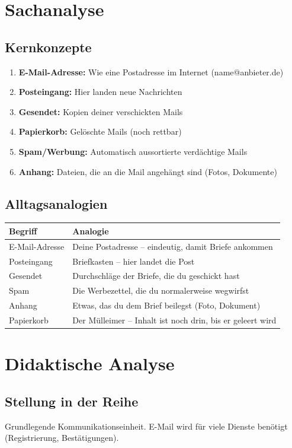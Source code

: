 \documentclass[11pt,a4paper]{article}
\begin{document}
\section{Sachanalyse}

\subsection{Kernkonzepte}
\begin{enumerate}
    \item \textbf{E-Mail-Adresse:} Wie eine Postadresse im Internet (name@anbieter.de)
    \item \textbf{Posteingang:} Hier landen neue Nachrichten
    \item \textbf{Gesendet:} Kopien deiner verschickten Mails
    \item \textbf{Papierkorb:} Gelöschte Mails (noch rettbar)
    \item \textbf{Spam/Werbung:} Automatisch aussortierte verdächtige Mails
    \item \textbf{Anhang:} Dateien, die an die Mail angehängt sind (Fotos, Dokumente)
\end{enumerate}

\subsection{Alltagsanalogien}
\begin{tabular}{|l|p{8cm}|}
\hline
\textbf{Begriff} & \textbf{Analogie} \\
\hline
E-Mail-Adresse & Deine Postadresse -- eindeutig, damit Briefe ankommen \\
Posteingang & Briefkasten -- hier landet die Post \\
Gesendet & Durchschläge der Briefe, die du geschickt hast \\
Spam & Die Werbezettel, die du normalerweise wegwirfst \\
Anhang & Etwas, das du dem Brief beilegst (Foto, Dokument) \\
Papierkorb & Der Mülleimer -- Inhalt ist noch drin, bis er geleert wird \\
\hline
\end{tabular}

\section{Didaktische Analyse}

\subsection{Stellung in der Reihe}
Grundlegende Kommunikationseinheit. E-Mail wird für viele Dienste benötigt (Registrierung, Bestätigungen).
\end{document}
